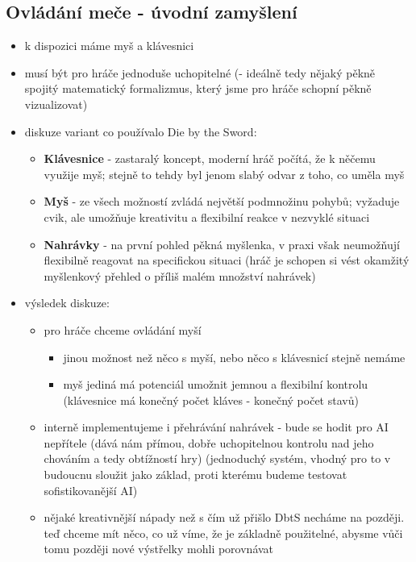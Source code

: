 \subsection{Ovládání meče - úvodní zamyšlení}
\begin{itemize}
    \item k dispozici máme myš a klávesnici
    \item musí být pro hráče jednoduše uchopitelné (- ideálně tedy nějaký pěkně spojitý matematický formalizmus, který jsme pro hráče schopní pěkně vizualizovat)
    \item diskuze variant co používalo Die by the Sword:
        \begin{itemize}
            \item \textbf{Klávesnice} - zastaralý koncept, moderní hráč počítá, že k něčemu využije myš; stejně to tehdy byl jenom slabý odvar z toho, co uměla myš
            \item \textbf{Myš} - ze všech možností zvládá největší podmnožinu pohybů; vyžaduje cvik, ale umožňuje kreativitu a flexibilní reakce v nezvyklé situaci
            \item \textbf{Nahrávky} - na první pohled pěkná myšlenka, v praxi však neumožňují flexibilně reagovat na specifickou situaci (hráč je schopen si vést okamžitý myšlenkový přehled o příliš malém množství nahrávek)
        \end{itemize}
    \item výsledek diskuze:
        \begin{itemize}
            \item pro hráče chceme ovládání myší
            \begin{itemize}
                \item jinou možnost než něco s myší, nebo něco s klávesnicí stejně nemáme
                \item myš jediná má potenciál umožnit jemnou a flexibilní kontrolu (klávesnice má konečný počet kláves - konečný počet stavů)
            \end{itemize}
            \item interně implementujeme i přehrávání nahrávek - bude se hodit pro AI nepřítele (dává nám přímou, dobře uchopitelnou kontrolu nad jeho chováním a tedy obtížností hry) (jednoduchý systém, vhodný pro to v budoucnu sloužit jako základ, proti kterému budeme testovat sofistikovanější AI)
            \item nějaké kreativnější nápady než s čím už přišlo DbtS necháme na později. teď chceme mít něco, co už víme, že je základně použitelné, abysme vůči tomu později nové výstřelky mohli porovnávat

\end{itemize}
\end{itemize}
